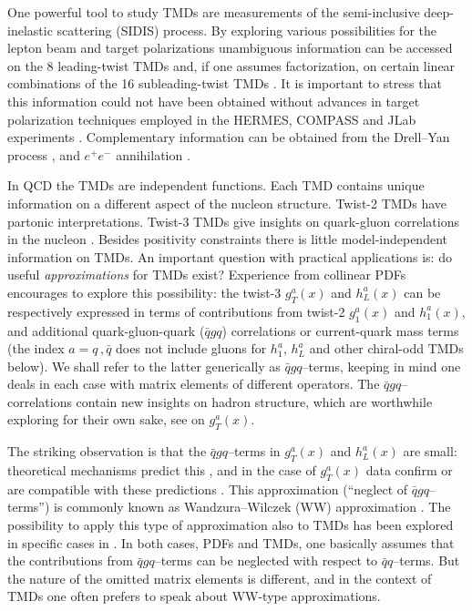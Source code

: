 \documentclass[a4paper,11pt]{article}
\begin{document}
One powerful tool to study TMDs are measurements of the 
semi-inclusive deep-inelastic scattering (SIDIS) process.
By exploring various possibilities for the lepton beam and target 
polarizations unambiguous information can be accessed on the 8 leading-twist 
TMDs \cite{Boer:1997nt} and, if one assumes factorization, on certain
linear combinations of the 16 subleading-twist TMDs 
\cite{Goeke:2005hb,Bacchetta:2006tn}.
	It is important to stress that this information could not have 
	been obtained without advances in target polarization techniques 
	employed in the HERMES, COMPASS and JLab experiments 
	\cite{Stock:1994vv,Crabb:1997cy,Goertz:2002vv}.
Complementary information can be obtained 
from the Drell--Yan process \cite{Arnold:2008kf}, 
and $e^+e^-$ annihilation \cite{Metz:2016swz}.

In QCD the TMDs are independent functions. Each TMD contains unique
information on a different aspect of the nucleon structure. 
Twist-2 TMDs have partonic interpretations. Twist-3 TMDs 
give insights on quark-gluon correlations in the nucleon
\cite{Miller:2007ae,Burkardt:2007rv,Burkardt:2009rf}. 
Besides positivity constraints \cite{Bacchetta:1999kz} 
there is little model-independent information on TMDs. 
An important question with practical applications is:
do useful {\sl approximations} for TMDs exist? 
Experience from collinear PDFs encourages to explore this possibility: 
the twist-3 $g_T^a(x)$ and $h_L^a(x)$ can be respectively expressed 
in terms of contributions from twist-2 $g_1^a(x)$ and $h_1^a(x)$, and 
additional quark-gluon-quark ($\bar{q}gq$) correlations or current-quark 
mass terms \cite{Wandzura:1977qf,Jaffe:1991ra}
(the index $a=q\,,\bar q$ does not include gluons for
$h_1^a$, $h_L^a$ and other chiral-odd TMDs below).
We shall refer to the latter generically as $\bar{q}gq$--terms, keeping in 
mind one deals in each case with matrix elements of different operators.
The $\bar{q}gq$--correlations contain new insights on hadron structure,
which are worthwhile exploring for their own sake, 
see \cite{Jaffe:1989xx} on $g_T^a(x)$.

The striking observation is that the $\bar{q}gq$--terms in $g_T^a(x)$ 
and $h_L^a(x)$ are small: theoretical mechanisms predict this 
\cite{Balla:1997hf,Dressler:1999hc,Gockeler:2000ja,Gockeler:2005vw}, 
and in the case of $g_T^a(x)$ data confirm or are compatible with these 
predictions \cite{Abe:1998wq,Anthony:2002hy,Airapetian:2011wu}.
This approximation (``neglect of $\bar{q}gq$--terms'') is commonly 
known as Wandzura--Wilczek (WW) approximation \cite{Wandzura:1977qf}.
The possibility to apply this type of approximation also to TMDs has 
been explored in specific cases in \cite{Kotzinian:1995cz,Kotzinian:1997wt,
Kotzinian:2006dw,Avakian:2007mv,Metz:2008ib,Teckentrup:2009tk,Tangerman:1994bb}.
In both cases, PDFs and TMDs, one basically assumes that the 
contributions from $\bar{q}gq$--terms can be neglected with respect to 
$\bar{q}q$--terms. But the nature of the omitted matrix elements is 
different, and in the context of TMDs one often prefers to speak 
about WW-type approximations.
\end{document}
